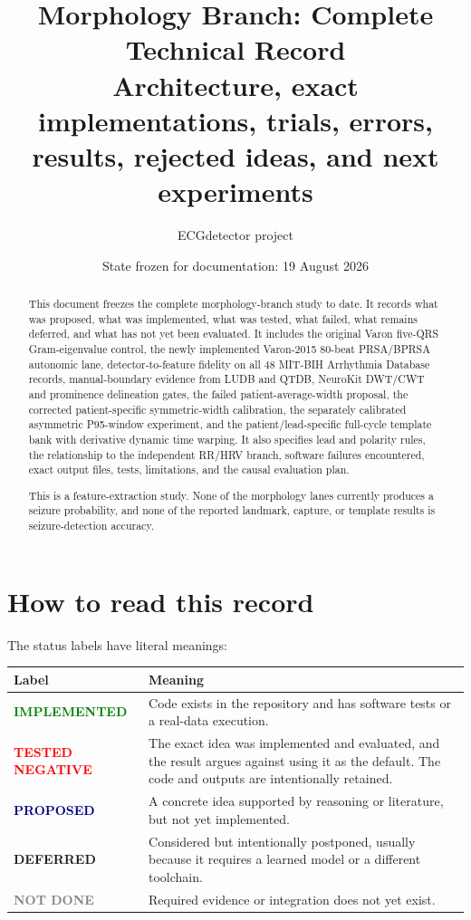 \documentclass[11pt,a4paper]{article}
\title{\textbf{Morphology Branch: Complete Technical Record}\\
\large Architecture, exact implementations, trials, errors, results, rejected ideas, and next experiments}
\author{ECGdetector project}
\date{State frozen for documentation: 19 August 2026}
\newcommand{\implemented}{\textcolor{green}{\textbf{IMPLEMENTED}}}
\newcommand{\testednegative}{\textcolor{red}{\textbf{TESTED NEGATIVE}}}
\newcommand{\deferred}{\textcolor{amber}{\textbf{DEFERRED}}}
\newcommand{\proposed}{\textcolor{navy}{\textbf{PROPOSED}}}
\newcommand{\notdone}{\textcolor{gray}{\textbf{NOT DONE}}}
\begin{document}
\maketitle

\begin{abstract}
This document freezes the complete morphology-branch study to date. It records what was proposed, what was implemented, what was tested, what failed, what remains deferred, and what has not yet been evaluated. It includes the original Varon five-QRS Gram-eigenvalue control, the newly implemented Varon-2015 80-beat PRSA/BPRSA autonomic lane, detector-to-feature fidelity on all 48 MIT-BIH Arrhythmia Database records, manual-boundary evidence from LUDB and QTDB, NeuroKit DWT/CWT and prominence delineation gates, the failed patient-average-width proposal, the corrected patient-specific symmetric-width calibration, the separately calibrated asymmetric P95-window experiment, and the patient/lead-specific full-cycle template bank with derivative dynamic time warping. It also specifies lead and polarity rules, the relationship to the independent RR/HRV branch, software failures encountered, exact output files, tests, limitations, and the causal evaluation plan.

This is a feature-extraction study. None of the morphology lanes currently produces a seizure probability, and none of the reported landmark, capture, or template results is seizure-detection accuracy.
\end{abstract}

\tableofcontents
\listoftables
\listoffigures
\clearpage

\section{How to read this record}

The status labels have literal meanings:

\begin{center}
\begin{tabularx}{\textwidth}{>{\bfseries}p{}X}
\toprule
Label & Meaning \\
\midrule
\implemented & Code exists in the repository and has software tests or a real-data execution. \\
\testednegative & The exact idea was implemented and evaluated, and the result argues against using it as the default. The code and outputs are intentionally retained. \\
\proposed & A concrete idea supported by reasoning or literature, but not yet implemented. \\
\deferred & Considered but intentionally postponed, usually because it requires a learned model or a different toolchain. \\
\notdone & Required evidence or integration does not yet exist. \\
\bottomrule
\end{tabularx}
\end{center}
\end{document}
